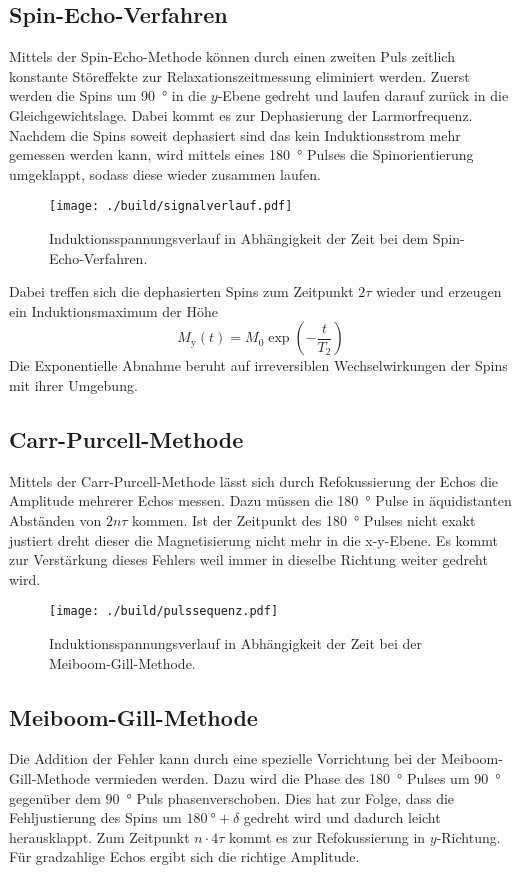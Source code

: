 \subsection{Spin-Echo-Verfahren}%
\label{sub:spin_echo_verfahren}
Mittels der Spin-Echo-Methode können durch einen zweiten Puls zeitlich
konstante Störeffekte zur Relaxationszeitmessung eliminiert werden. 
Zuerst werden die Spins um \SI{90}{\degree} in die $y$-Ebene gedreht und laufen
darauf zurück in die Gleichgewichtslage.
Dabei kommt es zur Dephasierung der Larmorfrequenz. 
Nachdem die Spins soweit dephasiert sind das kein Induktionsstrom mehr gemessen
werden kann, wird mittels eines \SI{180}{\degree} Pulses die Spinorientierung umgeklappt, 
sodass diese wieder zusammen laufen.
\begin{figure}[h]
		\centering
		\texttt{[image: ./build/signalverlauf.pdf]}
		\caption{Induktionsspannungsverlauf in Abhängigkeit der Zeit bei dem
		Spin-Echo-Verfahren. \cite{anleitung}}%
		\label{fig:sign}
\end{figure}
Dabei treffen sich die dephasierten Spins zum Zeitpunkt $2 \tau$ wieder und
erzeugen ein Induktionsmaximum der Höhe 
\begin{equation}
		\label{eq:}
		M_\text{y}(t) = M_0 \exp\left(-\frac{t}{T_2} \right)
\end{equation}
Die Exponentielle Abnahme beruht auf irreversiblen Wechselwirkungen der Spins mit
ihrer Umgebung. 

\subsection{Carr-Purcell-Methode}%
\label{sub:car_purcell}
Mittels der Carr-Purcell-Methode lässt sich durch Refokussierung der Echos die
Amplitude mehrerer Echos messen. 
Dazu müssen die \SI{180}{\degree} Pulse in äquidistanten Abständen von $2n\tau$
kommen. 
Ist der Zeitpunkt des \SI{180}{\degree} Pulses nicht exakt justiert dreht dieser die
Magnetisierung nicht mehr in die x-y-Ebene. 
Es kommt zur Verstärkung dieses Fehlers weil immer in dieselbe Richtung weiter
gedreht wird.

\begin{figure}[ht]
		\centering
		\texttt{[image: ./build/pulssequenz.pdf]}
		\caption{Induktionsspannungsverlauf in Abhängigkeit der Zeit bei der
		Meiboom-Gill-Methode. \cite{anleitung}}%
		\label{fig:}
\end{figure}

\subsection{Meiboom-Gill-Methode}%
\label{sub:meiboom_gill_methode}
Die Addition der Fehler kann durch eine spezielle Vorrichtung bei der
Meiboom-Gill-Methode vermieden werden.
Dazu wird die Phase des \SI{180}{\degree} Pulses um \SI{90}{\degree} gegenüber
dem \SI{90}{\degree} Puls phasenverschoben.
Dies hat zur Folge, dass die Fehljustierung des Spins um $\SI{180}{\degree} 
+ \delta$ gedreht wird und dadurch leicht herausklappt. 
Zum Zeitpunkt $n \cdot 4 \tau$ kommt es zur Refokussierung in $y$-Richtung.
Für gradzahlige Echos ergibt sich die richtige Amplitude.

